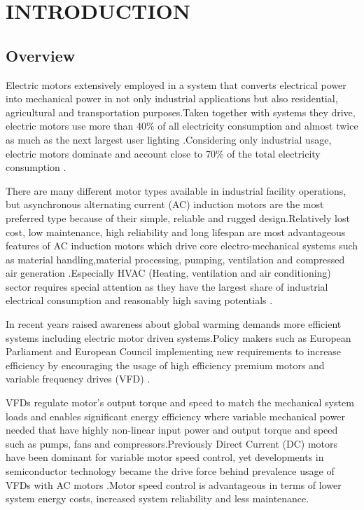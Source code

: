 \chapter{INTRODUCTION}\label{Ch1}
\section{Overview}
\label{overvıew}

Electric motors extensively employed in a system that converts electrical power into mechanical power in not only industrial applications but also residential, agricultural and transportation purposes.Taken together with systems they drive, electric motors use more than 40\% of all electricity consumption and almost twice as much as the next largest user lighting \cite{waide2011energy}.Considering only industrial usage, electric motors dominate and account close to 70\% of the total electricity consumption \cite{waide2011energy,kulterer2014policy}.

There are many different motor types available in industrial facility operations, but asynchronous alternating current (AC) induction motors are the most preferred type because of their simple, reliable and rugged design.Relatively lost cost, low maintenance, high reliability and long lifespan are most advantageous features of AC induction motors which drive core electro-mechanical systems such as material handling,material processing, pumping, ventilation and compressed air generation \cite{Fleiter2012EnergyEI}.Especially HVAC (Heating, ventilation and air conditioning) sector requires special attention as they have the largest share of industrial electrical consumption and reasonably high saving potentials \cite{Fleiter2012EnergyEI}.

In recent years raised awareness about global warming demands more efficient systems including electric motor driven systems.Policy makers such as European Parliament and European Council implementing new requirements to increase efficiency by encouraging the usage of high efficiency premium motors and variable frequency drives (VFD) \cite{kulterer2014policy,mikami2011historical}.

VFDs regulate motor's output torque and speed to match the mechanical system loads and enables significant energy efficiency where variable mechanical power needed that have highly non-linear input power and output torque and speed such as pumps, fans and compressors.Previously Direct Current (DC) motors have been dominant for variable motor speed control, yet developments in semiconductor technology became the drive force behind  prevalence usage of VFDs with AC motors \cite{doe2008improving}.Motor speed control is advantageous in terms of lower system energy costs, increased system reliability and less maintenance.  

